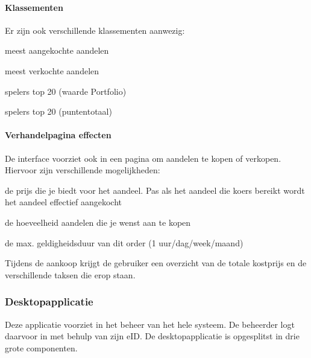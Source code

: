 \paragraph{Klassementen}Er zijn ook verschillende klassementen aanwezig:
\begin{itemize_compact}
	\item{meest aangekochte aandelen}
	\item{meest verkochte aandelen}
	\item{spelers top 20 (waarde Portfolio)}
	\item{spelers top 20 (puntentotaal)}
\end{itemize_compact}

\paragraph{Verhandelpagina effecten}De interface voorziet ook in een pagina om aandelen te kopen of verkopen. Hiervoor zijn verschillende mogelijkheden:
\begin{itemize_compact}
	\item{de prijs die je biedt voor het aandeel. Pas als het aandeel die koers bereikt wordt het aandeel effectief aangekocht}
	\item{de hoeveelheid aandelen die je wenst aan te kopen}
	\item{de max. geldigheidsduur van dit order (1 uur/dag/week/maand)}
\end{itemize_compact}
Tijdens de aankoop krijgt de gebruiker een overzicht van de totale kostprijs en de verschillende taksen die erop staan.

\subsubsection{Desktopapplicatie}
Deze applicatie voorziet in het beheer van het hele systeem. De beheerder logt daarvoor in met behulp van zijn eID.
De desktopapplicatie is opgesplitst in drie grote componenten.

